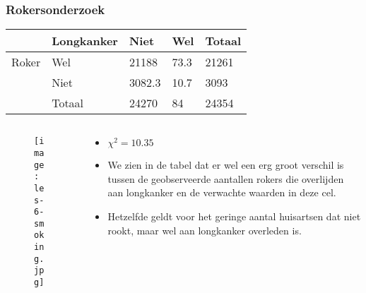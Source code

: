 \documentclass[aspectratio=169]{beamer}
\begin{document}
\begin{frame}
  \frametitle{Rokersonderzoek}
  \begin{table}[h]
    \begin{tabular}{@{}lllll@{}}
      \toprule
      & \textbf{Longkanker} & \textbf{Niet} & \textbf{Wel} & \textbf{Totaal} \\ \midrule
      Roker & Wel                 & 21188         & 73.3         & 21261           \\
      & Niet                & 3082.3        & 10.7         & 3093            \\
      & Totaal              & 24270         & 84           & 24354           \\ \bottomrule
    \end{tabular}
  \end{table}
  
  \begin{columns}
    \begin{column}{0.3 \textwidth}
      
      \begin{figure}
        \centering
        \texttt{[image: les-6-smoking.jpg]}
      \end{figure}
      
    \end{column}
    \begin{column}{0.7 \textwidth}
      
      \begin{itemize}
        \item $\chi^{2} = 10.35$
        \item We zien in de tabel  dat er wel een erg groot verschil is tussen de geobserveerde aantallen rokers die overlijden aan longkanker en de verwachte waarden in deze cel.
        \item Hetzelfde geldt voor het geringe aantal huisartsen dat niet rookt, maar wel aan longkanker overleden is.
      \end{itemize}
    \end{column}
  \end{columns}
\end{frame}
\end{document}
